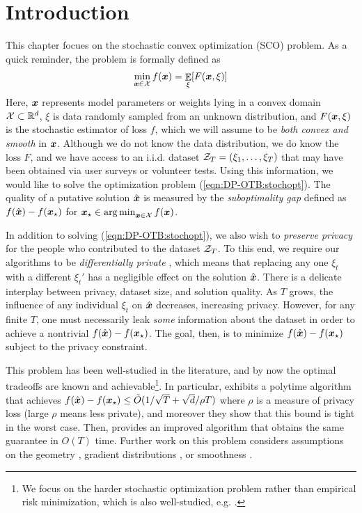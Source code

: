 \section{Introduction} \label{sec:DP-OTB_intro}

This chapter focues on the stochastic convex optimization (SCO) problem. As a quick reminder, the problem is formally defined as
\begin{align}
    \min_{{\boldsymbol{x}}\in {\cal X}} f({\boldsymbol{x}}) = \mathop{\mathbb{E}}_{\xi}[F({\boldsymbol{x}},\xi)]
    \label{eqn:DP-OTB:stochopt}
\end{align}
Here, ${\boldsymbol{x}}$ represents model parameters or weights lying in a convex domain ${\cal X}\subset \mathbb R^d$, $\xi$ is data randomly sampled from an unknown distribution, and $F({\boldsymbol{x}},\xi)$ is the stochastic estimator of loss $f$, which we will assume to be \emph{both convex and smooth} in ${\boldsymbol{x}}$. Although we do not know the data distribution, we do know the loss $F$, and we have access to an i.i.d. dataset ${\cal Z}_T=(\xi_1,\dots,\xi_T)$ that may have been obtained via user surveys or volunteer tests. Using this information, we would like to solve the optimization problem (\ref{eqn:DP-OTB:stochopt}). The quality of a putative solution $\hat {{\boldsymbol{x}}}$ is measured by the \emph{suboptimality gap} defined as $f(\hat {{\boldsymbol{x}}}) - f({\boldsymbol{x}}_\star)$ for ${\boldsymbol{x}}_\star \in \mathop{\operatorname{arg\,min}}_{{\boldsymbol{x}}\in {\cal X}} f({\boldsymbol{x}})$.

In addition to solving (\ref{eqn:DP-OTB:stochopt}), we also wish to \emph{preserve privacy} for the people who contributed to the dataset ${\cal Z}_T$. To this end, we require our algorithms to be \emph{differentially private} \citep{dwork2006calibrating, dwork2014algorithmic}, which means that replacing any one $\xi_t$ with a different $\xi_t'$ has a negligible effect on the solution $\hat {{\boldsymbol{x}}}$. There is a delicate interplay between privacy, dataset size, and solution quality. As $T$ grows, the influence of any individual $\xi_t$ on $\hat {{\boldsymbol{x}}}$ decreases, increasing privacy. However, for any finite $T$, one must necessarily leak \emph{some} information about the dataset in order to achieve a nontrivial $f(\hat {{\boldsymbol{x}}})-f({\boldsymbol{x}}_\star)$. The goal, then, is to minimize $f(\hat {{\boldsymbol{x}}})-f({\boldsymbol{x}}_\star)$ subject to the privacy constraint.

This problem has been well-studied in the literature, and by now the optimal tradeoffs are known and achievable\footnote{We focus on the harder stochastic optimization problem rather than empirical risk minimization, which is also well-studied, e.g. \citep{chaudhuri2011differentially, kifer2012private}.}. In particular, \cite{bassily2019private} exhibits a polytime algorithm that achieves $f(\hat {{\boldsymbol{x}}})-f({\boldsymbol{x}}_\star)\le \tilde O(1/\sqrt{T} + \sqrt{d}/\rho T)$ where $\rho$ is a measure of privacy loss (large $\rho$ means less private), and moreover they show that this bound is tight in the worst case. Then, \cite{feldman2020private} provides an improved algorithm that obtains the same guarantee in $O(T)$ time. Further work on this problem considers assumptions on the geometry \citep{asi2021private}, gradient distributions \citep{kamath2021improved}, or smoothness \citep{bassily2020stability, kulkarni2021private}.

